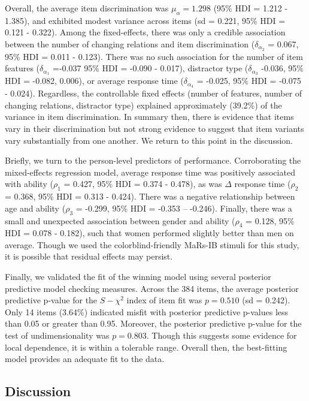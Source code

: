 \documentclass[a4paper,man,natbib]{apa6}
\begin{document}
Overall, the average item discrimination was $\mu_\alpha = 1.298$ (95\% HDI = 1.212 - 1.385), and exhibited modest variance across items (sd = 0.221, 95\% HDI = 0.121 - 0.322). Among the fixed-effects, there was only a credible association between the number of changing relations and item discrimination ($\delta_{\alpha_2}$ = 0.067, 95\% HDI = 0.011 - 0.123). There was no such association for the number of item features ($\delta_{\alpha_1}$ =-0.037 95\% HDI = -0.090 - 0.017), distractor type ($\delta_{\alpha_3}$ -0.036, 95\% HDI = -0.082, 0.006), or average response time ($\delta_{\alpha_4}$ = -0.025, 95\% HDI = -0.075 - 0.024). Regardless, the controllable fixed effects (number of features, number of changing relations, distractor type) explained approximately (39.2\%) of the variance in item discrimination. In summary then, there is evidence that items vary in their discrimination but not strong evidence to suggest that item variants vary substantially from one another. We return to this point in the discussion.

Briefly, we turn to the person-level predictors of performance. Corroborating the mixed-effects regression model, average response time was positively associated with ability ($\rho_1$ = 0.427, 95\% HDI = 0.374 - 0.478), as was $\Delta$ response time ($\rho_2$ = 0.368, 95\% HDI = 0.313 - 0.424). There was a negative relationship between age and ability ($\rho_3$ = -0.299, 95\% HDI = -0.353 -- -0.246). Finally, there was a small and unexpected association between gender and ability ($\rho_4$ = 0.128, 95\% HDI = 0.078 - 0.182), such that women performed slightly better than men on average. Though we used the colorblind-friendly MaRs-IB stimuli for this study, it is possible that residual effects may persist. 

Finally, we validated the fit of the winning model using several posterior predictive model checking measures. Across the 384 items, the average posterior predictive p-value for the $S-\chi^2$ index of item fit was $p = 0.510$ (sd = 0.242). Only 14 items (3.64\%) indicated misfit with posterior predictive p-values less than 0.05 or greater than 0.95. Moreover, the posterior predictive p-value for the test of undimensionality was $p = 0.803$. Though this suggests some evidence for local dependence, it is within a tolerable range. Overall then, the best-fitting model provides an adequate fit to the data.

\subsection{Discussion}
\end{document}
